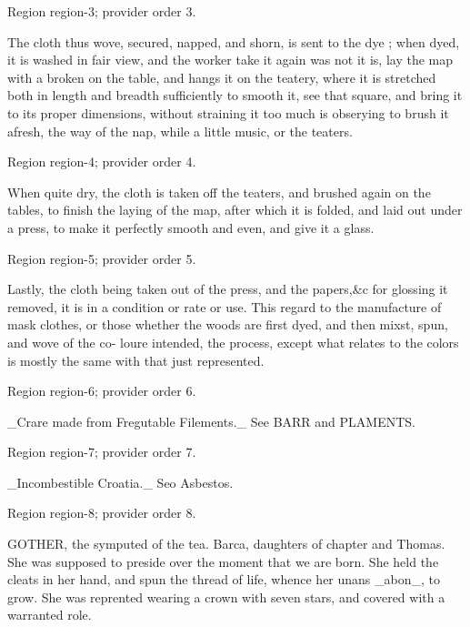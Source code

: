 \documentclass[11pt]{article}
\begin{document}
{\scriptsize\color{gray} Region region-3; provider order 3.\par}
\medskip

The cloth thus wove, secured, napped, and shorn, is sent to the dye ; when dyed, it is washed in fair view, and the worker take it again was not it is, lay the map with a broken on the table, and hangs it on the teatery, where it is stretched both in length and breadth sufficiently to smooth it, see that square, and bring it to its proper dimensions, without straining it too much is obserying to brush it afresh, the way of the nap, while a little music, or the teaters.
\par

{\scriptsize\color{gray} Region region-4; provider order 4.\par}
\medskip

When quite dry, the cloth is taken off the teaters, and brushed again on the tables, to finish the laying of the map, after which it is folded, and laid out under a press, to make it perfectly smooth and even, and give it a glass.
\par

{\scriptsize\color{gray} Region region-5; provider order 5.\par}
\medskip

Lastly, the cloth being taken out of the press, and the papers,\&c for glossing it removed, it is in a condition or rate or use. This regard to the manufacture of mask clothes, or those whether the woods are first dyed, and then mixst, spun, and wove of the co- loure intended, the process, except what relates to the colors is mostly the same with that just represented.
\par

{\scriptsize\color{gray} Region region-6; provider order 6.\par}
\medskip

\_Crare made from Fregutable Filements.\_ See BARR and PLAMENTS.
\par

{\scriptsize\color{gray} Region region-7; provider order 7.\par}
\medskip

\_Incombestible Croatia.\_ Seo Asbestos.
\par

{\scriptsize\color{gray} Region region-8; provider order 8.\par}
\medskip

GOTHER, the symputed of the tea. Barca, daughters of chapter and Thomas. She was supposed to preside over the moment that we are born. She held the cleats in her hand, and spun the thread of life, whence her unans \_abon\_, to grow. She was reprented wearing a crown with seven stars, and covered with a warranted role.
\par
\end{document}
